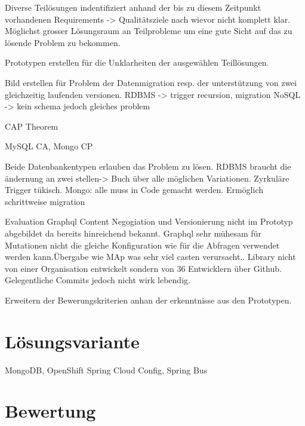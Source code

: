 Diverse Teilösungen indentifiziert anhand der bis zu diesem Zeitpunkt vorhandenen Requirements -> Qualitätsziele nach wievor nicht komplett klar.
Möglichst grosser Lösungsraum an Teilprobleme um eine gute Sicht auf das zu lösende Problem zu bekommen.

Prototypen erstellen für die Unklarheiten der ausgewählen Teillösungen.

Bild erstellen für Problem der Datenmigration resp. der unterstützung von zwei gleichzeitig laufenden versionen.
RDBMS -> trigger recursion, migration
NoSQL -> kein schema jedoch gleiches problem

CAP Theorem

MySQL CA, Mongo CP

Beide Datenbankentypen erlauben das Problem zu lösen. RDBMS braucht die ändernung an zwei stellen-> Buch über alle möglichen Variationen. Zyrkuläre Trigger tükisch. Mongo: alle muss in Code gemacht werden. Ermöglich schrittweise migration


Evaluation Graphql
Content Negogiation und Versionierung nicht im Prototyp abgebildet da bereits hinreichend bekannt.
Graphql sehr mühesam für Mutationen nicht die gleiche Konfiguration wie für die Abfragen verwendet werden kann.Übergabe wie MAp was sehr viel casten verursacht.. Library nicht von einer Organisation entwickelt sondern von 36 Entwicklern über Github. Gelegentliche Commits jedoch nicht wirk lebendig. 

Erweitern der Bewerungskriterien anhan der erkenntnisse aus den Prototypen.

\section{Lösungsvariante}

MongoDB, OpenShift Spring Cloud Config, Spring Bus

\section{Bewertung}











